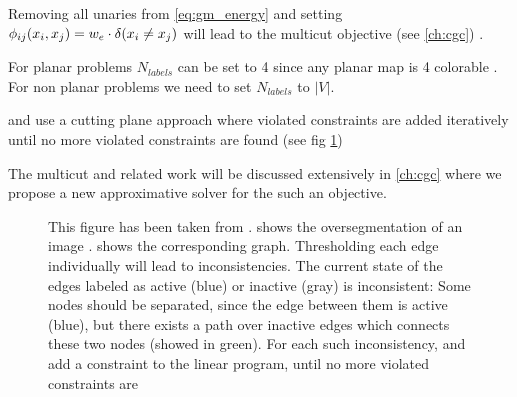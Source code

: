 Removing all unaries from \cref{eq:gm_energy} and 
setting $\phi_{ij}(x_i,x_j) =   w_e \cdot \delta( x_i \neq x_j )$ 
will lead to the multicut objective (see \cref{ch:cgc}) .

For planar problems  $N_{labels}$ can be set to 4 since any planar map is 4 colorable \citep{appel_1977_4color}.
For non planar problems we need to set $N_{labels}$ to $|V|$.


\citet{andres_2011_iccv} and \citet{kappes_2011_emmcvpr} use a
cutting plane approach where violated constraints are added
iteratively until no more violated constraints are found (see fig \cref{fig:mc_ineq})

The multicut and related work will be discussed extensively in \cref{ch:cgc} where
we propose a new approximative solver for the such an objective.


\begin{figure}[h]
\centering
{}
%
\caption[Violated multicut constraints]{
This figure has been taken from \cite{andres_2011_iccv}.
 shows the oversegmentation of 
an image .
 shows the corresponding graph.
Thresholding each edge individually will lead to inconsistencies.
The current state of the edges  labeled as active (blue) or inactive (gray) is
inconsistent: Some nodes should be separated, since the edge between them is
active (blue), but there exists a path over inactive edges 
which connects these two nodes (showed in green).
For each such inconsistency, \citet{andres_2011_iccv} and \citet{kappes_2011_emmcvpr}
add a constraint to the linear program, until no more violated constraints 
are 
} \label{fig:mc_ineq}
\end{figure}


